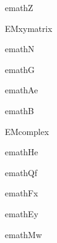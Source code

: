 \documentclass[a4j]{jarticle}
\begin{document}
\noindent
emathZ
  \begin{zyukeizu}
  \end{zyukeizu}

\noindent
EMxymatrix
  \begin{zyukeizu}
  \end{zyukeizu}

\noindent
emathN
  \begin{zyukeizu}
  \end{zyukeizu}

\noindent
emathG
  \begin{zyukeizu}
  \end{zyukeizu}

\noindent
emathAe
  \begin{zyukeizu}
  \end{zyukeizu}

\noindent
emathB
  \begin{zyukeizu}
  \end{zyukeizu}

\noindent
EMcomplex
  \begin{zyukeizu}
  \end{zyukeizu}

\noindent
emathHe
  \begin{zyukeizu}
  \end{zyukeizu}

\noindent
emathQf
  \begin{zyukeizu}
  \end{zyukeizu}

\noindent
emathFx
  \begin{zyukeizu}
  \end{zyukeizu}


\noindent
emathEy
    \begin{zyukeizu}
    \end{zyukeizu}

\noindent
emathMw
  \begin{zyukeizu}
  \end{zyukeizu}
\end{document}
